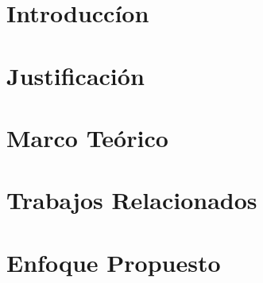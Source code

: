 \documentclass[journal]{IEEEtran}
\begin{document}



\maketitle





\section{Introduccíon}


\section{Justificación}


\section{Marco Teórico}


\section{Trabajos Relacionados}


\section{Enfoque Propuesto}

\end{document}
